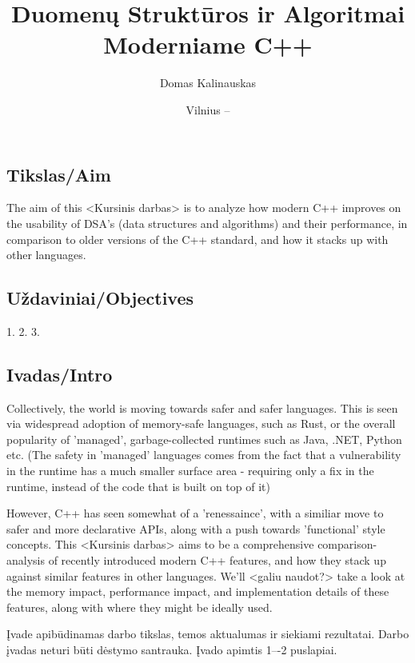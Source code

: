 \documentclass[
    english, %
]{VUMIFPSkursinis}
\title{Duomenų Struktūros ir Algoritmai Moderniame C++}
\author{Domas Kalinauskas}
\date{Vilnius – \the\year}
\begin{document}
\maketitle

\tableofcontents


\subsection{Tikslas/Aim}

The aim of this <Kursinis darbas> is to analyze how modern C++ improves on
the usability of DSA's (data structures and algorithms) and their performance, in comparison to older versions
of the C++ standard, and how it stacks up with other languages.

\subsection{Uždaviniai/Objectives}

1. 
2.
3.

\subsection{Ivadas/Intro}

Collectively, the world is moving towards safer and safer languages. This is seen via widespread adoption of memory-safe languages,
such as Rust, or the overall popularity of 'managed', garbage-collected runtimes such as Java, .NET, Python etc.
(The safety in 'managed' languages comes from the fact that a vulnerability in the runtime has a much smaller surface area - requiring only a fix in the runtime, instead of the code that is built on top of it)

However, C++ has seen somewhat of a 'renessaince', with a similiar move to safer and more declarative APIs, along with a push towards 'functional' style concepts.
This <Kursinis darbas> aims to be a comprehensive comparison-analysis of recently introduced modern C++ features, and how they stack up against similar features in other languages.
We'll <galiu naudot?> take a look at the memory impact, performance impact, and implementation details of these features, along with where they might be ideally used.

Įvade apibūdinamas darbo tikslas, temos aktualumas ir siekiami rezultatai.
Darbo įvadas neturi būti dėstymo santrauka. Įvado apimtis 1–-2 puslapiai.
\end{document}

